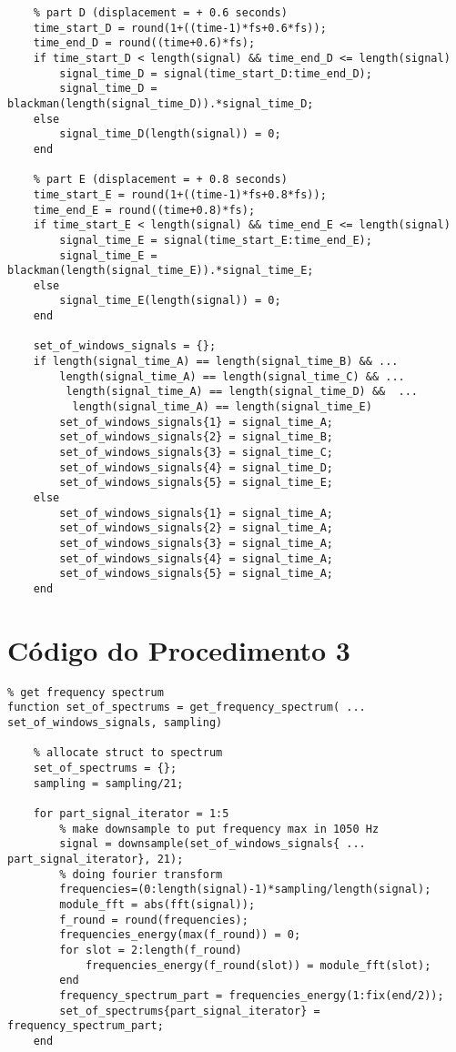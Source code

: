 \begin{apendicesenv}
\begin{lstlisting}
    % part D (displacement = + 0.6 seconds)
    time_start_D = round(1+((time-1)*fs+0.6*fs));
    time_end_D = round((time+0.6)*fs);
    if time_start_D < length(signal) && time_end_D <= length(signal)
        signal_time_D = signal(time_start_D:time_end_D);
        signal_time_D = blackman(length(signal_time_D)).*signal_time_D;
    else
        signal_time_D(length(signal)) = 0;
    end

    % part E (displacement = + 0.8 seconds)
    time_start_E = round(1+((time-1)*fs+0.8*fs));
    time_end_E = round((time+0.8)*fs);
    if time_start_E < length(signal) && time_end_E <= length(signal)
        signal_time_E = signal(time_start_E:time_end_E);
        signal_time_E = blackman(length(signal_time_E)).*signal_time_E;
    else
        signal_time_E(length(signal)) = 0;
    end

    set_of_windows_signals = {};
    if length(signal_time_A) == length(signal_time_B) && ...
        length(signal_time_A) == length(signal_time_C) && ...
         length(signal_time_A) == length(signal_time_D) &&  ...
          length(signal_time_A) == length(signal_time_E)
        set_of_windows_signals{1} = signal_time_A;
        set_of_windows_signals{2} = signal_time_B;
        set_of_windows_signals{3} = signal_time_C;
        set_of_windows_signals{4} = signal_time_D;
        set_of_windows_signals{5} = signal_time_E;
    else
        set_of_windows_signals{1} = signal_time_A;
        set_of_windows_signals{2} = signal_time_A;
        set_of_windows_signals{3} = signal_time_A;
        set_of_windows_signals{4} = signal_time_A;
        set_of_windows_signals{5} = signal_time_A;
    end
\end{lstlisting}

\section{Código do Procedimento 3}
\label{sec:codigo_procedimento_3}
\begin{lstlisting}
% get frequency spectrum
function set_of_spectrums = get_frequency_spectrum( ...
set_of_windows_signals, sampling)

    % allocate struct to spectrum
    set_of_spectrums = {};
    sampling = sampling/21;

    for part_signal_iterator = 1:5
    	% make downsample to put frequency max in 1050 Hz
        signal = downsample(set_of_windows_signals{ ...
part_signal_iterator}, 21);
        % doing fourier transform
        frequencies=(0:length(signal)-1)*sampling/length(signal);
        module_fft = abs(fft(signal));
        f_round = round(frequencies);
        frequencies_energy(max(f_round)) = 0;
        for slot = 2:length(f_round)
            frequencies_energy(f_round(slot)) = module_fft(slot);
        end
        frequency_spectrum_part = frequencies_energy(1:fix(end/2));
        set_of_spectrums{part_signal_iterator} = frequency_spectrum_part;
    end
\end{lstlisting}


\end{apendicesenv}
